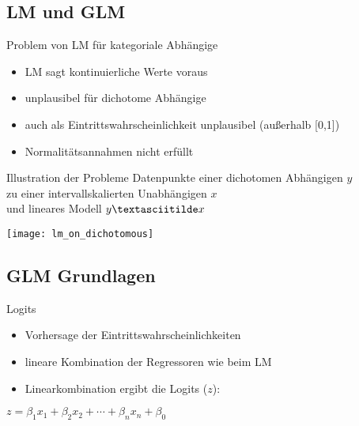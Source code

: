 \subsection{LM und GLM}

\begin{frame}
  {Problem von LM für kategoriale Abhängige}
  \begin{itemize}[<+->]
    \item LM sagt \alert{kontinuierliche Werte} voraus
    \item unplausibel für dichotome Abhängige
    \item auch als Eintrittswahrscheinlichkeit unplausibel (außerhalb [0,1])
    \item \alert{Normalitätsannahmen nicht erfüllt}
  \end{itemize}
\end{frame}

\begin{frame}
  {Illustration der Probleme}
  Datenpunkte einer dichotomen Abhängigen $y$\\
  zu einer intervallskalierten Unabhängigen $x$\\
  und lineares Modell $y\textasciitilde x$
  \begin{center}
    \texttt{[image: lm\_on\_dichotomous]}
  \end{center}
\end{frame}

\subsection{GLM Grundlagen}

\begin{frame}
  {Logits}
  \begin{itemize}[<+->]
    \item Vorhersage der \alert{Eintrittswahrscheinlichkeiten}
    \item \alert{lineare Kombination der Regressoren} wie beim LM
    \item Linearkombination ergibt die \alert{Logits} ($z$):
  \end{itemize}
  \pause
  \begin{center}
    $z=\beta_1x_1 + \beta_2x_2 + \cdots + \beta_nx_n + \beta_0$
  \end{center}
\end{frame}

